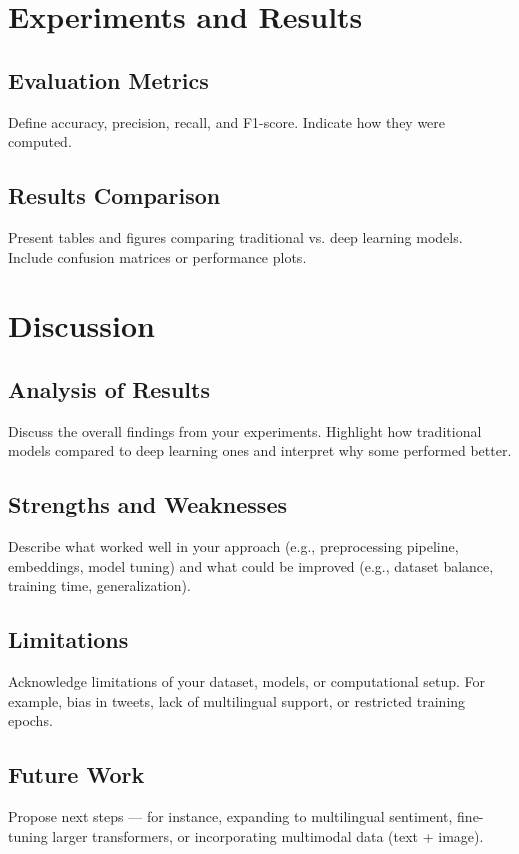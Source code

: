 \documentclass[10pt]{article}
\begin{document}
\section{Experiments and Results}
\subsection{Evaluation Metrics}
Define accuracy, precision, recall, and F1-score. Indicate how they were computed.

\subsection{Results Comparison}
Present tables and figures comparing traditional vs. deep learning models. Include confusion matrices or performance plots.

\section{Discussion}
\subsection{Analysis of Results}
Discuss the overall findings from your experiments. Highlight how traditional models compared to deep learning ones and interpret why some performed better.

\subsection{Strengths and Weaknesses}
Describe what worked well in your approach (e.g., preprocessing pipeline, embeddings, model tuning) and what could be improved (e.g., dataset balance, training time, generalization).

\subsection{Limitations}
Acknowledge limitations of your dataset, models, or computational setup. For example, bias in tweets, lack of multilingual support, or restricted training epochs.

\subsection{Future Work}
Propose next steps — for instance, expanding to multilingual sentiment, fine-tuning larger transformers, or incorporating multimodal data (text + image).
\end{document}
